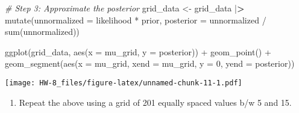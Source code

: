 \documentclass[
]{article}
\newenvironment{Shaded}{\begin{snugshade}}{\end{snugshade}}
\newcommand{\AttributeTok}[1]{\textcolor[rgb]{0.77,0.63,0.00}{#1}}
\newcommand{\CommentTok}[1]{\textcolor[rgb]{0.56,0.35,0.01}{\textit{#1}}}
\newcommand{\DecValTok}[1]{\textcolor[rgb]{0.00,0.00,0.81}{#1}}
\newcommand{\ErrorTok}[1]{\textcolor[rgb]{0.64,0.00,0.00}{\textbf{#1}}}
\newcommand{\FunctionTok}[1]{\textcolor[rgb]{0.00,0.00,0.00}{#1}}
\newcommand{\NormalTok}[1]{#1}
\newcommand{\OtherTok}[1]{\textcolor[rgb]{0.56,0.35,0.01}{#1}}
\newcommand{\SpecialCharTok}[1]{\textcolor[rgb]{0.00,0.00,0.00}{#1}}
\providecommand{\tightlist}{%
  \setlength{\itemsep}{0pt}\setlength{\parskip}{0pt}}
\begin{document}
\begin{Shaded}
\begin{Highlighting}[]
\CommentTok{\# Step 3: Approximate the posterior}
\NormalTok{grid\_data }\OtherTok{\textless{}{-}}\NormalTok{ grid\_data }\SpecialCharTok{|}\ErrorTok{\textgreater{}}  
  \FunctionTok{mutate}\NormalTok{(}\AttributeTok{unnormalized =}\NormalTok{ likelihood }\SpecialCharTok{*}\NormalTok{ prior,}
         \AttributeTok{posterior =}\NormalTok{ unnormalized }\SpecialCharTok{/} \FunctionTok{sum}\NormalTok{(unnormalized))}

\FunctionTok{ggplot}\NormalTok{(grid\_data, }\FunctionTok{aes}\NormalTok{(}\AttributeTok{x =}\NormalTok{ mu\_grid, }\AttributeTok{y =}\NormalTok{ posterior)) }\SpecialCharTok{+} 
  \FunctionTok{geom\_point}\NormalTok{() }\SpecialCharTok{+} 
  \FunctionTok{geom\_segment}\NormalTok{(}\FunctionTok{aes}\NormalTok{(}\AttributeTok{x =}\NormalTok{ mu\_grid, }\AttributeTok{xend =}\NormalTok{ mu\_grid, }\AttributeTok{y =} \DecValTok{0}\NormalTok{, }\AttributeTok{yend =}\NormalTok{ posterior))}
\end{Highlighting}
\end{Shaded}

\texttt{[image: HW-8\_files/figure-latex/unnamed-chunk-11-1.pdf]}

\begin{enumerate}
\def\labelenumi{\alph{enumi})}
\setcounter{enumi}{1}
\tightlist
\item
  Repeat the above using a grid of 201 equally spaced values b/w 5 and
  15.
\end{enumerate}
\end{document}
